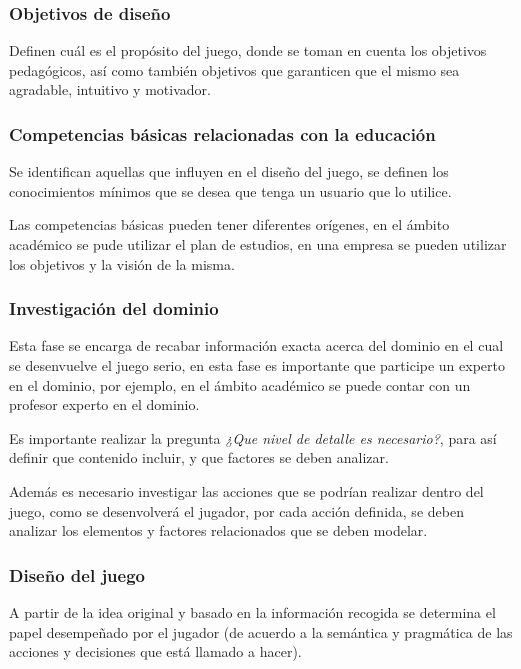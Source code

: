 \subsubsection{Objetivos de diseño}

Definen cuál es el propósito del juego, donde se toman en cuenta los objetivos
pedagógicos, así como también objetivos que garanticen que el mismo sea
agradable, intuitivo y motivador.

\subsubsection{Competencias básicas relacionadas con la educación} 

Se identifican aquellas que influyen en el diseño del juego, se definen los
conocimientos mínimos que se desea que tenga un usuario que lo utilice.

Las competencias básicas pueden tener diferentes orígenes, en el ámbito
académico se pude utilizar el plan de estudios, en una empresa se pueden
utilizar los objetivos y la visión de la misma.

\subsubsection{Investigación del dominio}

Esta fase se encarga de recabar información exacta acerca del dominio en el cual
se desenvuelve el juego serio, en esta fase es importante que participe un
experto en el dominio, por ejemplo, en el ámbito académico se puede contar con
un profesor experto en el dominio.

Es importante realizar la pregunta \emph{¿Que nivel de detalle es necesario?},
para así definir que contenido incluir, y que factores se deben analizar.

Además es necesario investigar las acciones que se podrían realizar dentro del
juego, como se desenvolverá el jugador, por cada acción definida, se deben
analizar los elementos y factores relacionados que se deben modelar.

\subsubsection{Diseño del juego}

A partir de la idea original y basado en la información recogida se determina
el papel desempeñado por el jugador (de acuerdo a la semántica y pragmática de
las acciones y decisiones que está llamado a hacer). 

